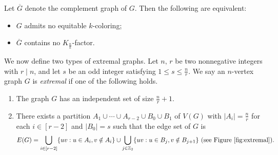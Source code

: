 \documentclass[11pt, a4paper]{article}
\theoremstyle{definition}
\newcommand{\<}{\subseteq}
\begin{document}
Let $\overline{G}$ denote the complement graph of $G$. Then the following are equivalent:
\begin{itemize}
\item $G$ admits no equitable $k$-coloring;
\item $\overline{G}$ contains no $K_{\frac{n}{k}}$-factor.
\end{itemize}
We now define two types of extremal graphs. Let $n,\,r$ be two  nonnegative integers with $r\mid n$,  and let $s$ be an odd integer satisfying $1\leq s\le \frac{n}{r}$. %
We say an $n$-vertex graph $G$ is \textit{extremal} if one of the following holds. 
 \begin{enumerate}
[label =\rm  (EX\arabic{enumi})]
    \item\label{EX1} The graph $G$ has an independent set of size $\frac{n}{r}+1$. %
    
    \item\label{EX2} %
    There exists a partition  $A_1\cup \cdots\cup A_{r-2}\cup B_0\cup B_1$ of $V(G)$ with $|A_i|=\frac{n}{r}$ for each $i\in [r-2]$ and $|B_0|=s$ such that the edge set of $G$ is %
$$
E(G)=\bigcup_{i\in [r-2]}\{uv:u\in A_i, v\notin A_i\}\cup \bigcup_{j\in \mathbb{Z}_2}\{uv:u\in B_j, v\notin B_{j+1}\}\ \text{(see Figure \ref{fig:extremal})}.
$$   
    
\end{enumerate}
\end{document}
